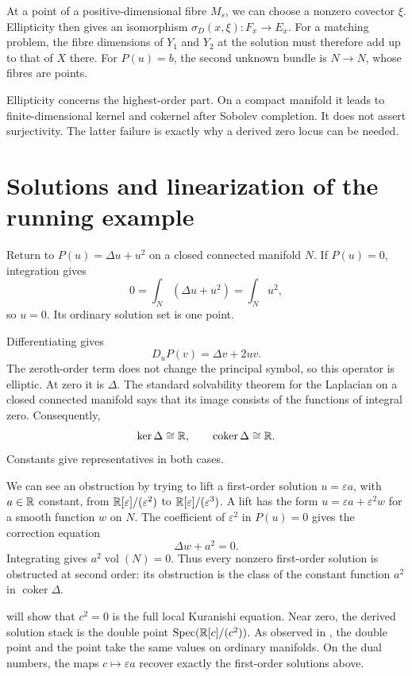 At a point of a positive-dimensional fibre $M_s$, we can choose a
nonzero covector $\xi$. Ellipticity then gives an isomorphism
$\sigma_D(x,\xi)\colon F_x\to E_x$. For a matching problem, the
fibre dimensions of $Y_1$ and $Y_2$ at the solution must therefore
add up to that of $X$ there. For $P(u)=b$, the second unknown bundle
is $N\to N$, whose fibres are points.

Ellipticity concerns the highest-order part. On a compact manifold
it leads to finite-dimensional kernel and cokernel after Sobolev
completion. It does not assert surjectivity. The latter failure is
exactly why a derived zero locus can be needed.

\section{Solutions and linearization of the running example}

Return to $P(u)=\Delta u+u^2$ on a closed connected manifold $N$.
If $P(u)=0$, integration gives
\[
 0=\int_N(\Delta u+u^2)=\int_Nu^2,
\]
so $u=0$. Its ordinary solution set is one point.

Differentiating gives
\[
 D_uP(v)=\Delta v+2uv.
\]
The zeroth-order term does not change the principal symbol, so this
operator is elliptic. At zero it is $\Delta$.
The standard solvability theorem for the Laplacian on a closed connected
manifold says that its image consists of the functions of integral zero.
Consequently,
\[
 \ker\Delta\cong\mathbb{R},\qquad\operatorname{coker}\Delta\cong\mathbb{R}.
\]
Constants give representatives in both cases.

We can see an obstruction by trying to lift a first-order solution
$u=\varepsilon a$, with $a\in\mathbb{R}$ constant, from
$\mathbb{R}[\varepsilon]/(\varepsilon^2)$ to $\mathbb{R}[\varepsilon]/(\varepsilon^3)$.
A lift has the form $u=\varepsilon a+\varepsilon^2w$ for a smooth
function $w$ on $N$. The coefficient of $\varepsilon^2$ in $P(u)=0$
gives the correction equation
\[
 \Delta w+a^2=0.
\]
Integrating gives $a^2\operatorname{vol}(N)=0$. Thus every nonzero
first-order solution is obstructed at second order: its obstruction
is the class of the constant function $a^2$ in $\operatorname{coker}\Delta$.

 will show that
$c^2=0$ is the full local Kuranishi equation. Near zero, the
derived solution stack is the double point
$\operatorname{Spec}(\mathbb{R}[c]/(c^2))$. As observed in
, the double point and the
point take the same values on ordinary manifolds. On the dual numbers,
the maps $c\mapsto\varepsilon a$ recover exactly the first-order
solutions above.

